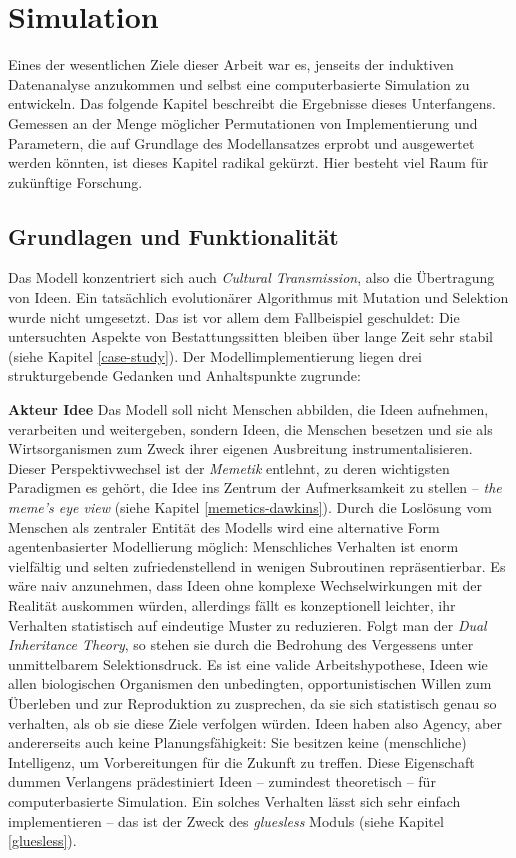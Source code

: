\documentclass[openany,twoside,twocolumn]{book}
\begin{document}
\hypertarget{simulation}{%
\section{Simulation}\label{simulation}}

Eines der wesentlichen Ziele dieser Arbeit war es, jenseits der
induktiven Datenanalyse anzukommen und selbst eine computerbasierte
Simulation zu entwickeln. Das folgende Kapitel beschreibt die Ergebnisse
dieses Unterfangens. Gemessen an der Menge möglicher Permutationen von
Implementierung und Parametern, die auf Grundlage des Modellansatzes
erprobt und ausgewertet werden könnten, ist dieses Kapitel radikal
gekürzt. Hier besteht viel Raum für zukünftige Forschung.

\hypertarget{simulation-theorie}{%
\subsection{Grundlagen und Funktionalität}\label{simulation-theorie}}

Das Modell konzentriert sich auch \emph{Cultural Transmission}, also die
Übertragung von Ideen. Ein tatsächlich evolutionärer Algorithmus mit
Mutation und Selektion wurde nicht umgesetzt. Das ist vor allem dem
Fallbeispiel geschuldet: Die untersuchten Aspekte von Bestattungssitten
bleiben über lange Zeit sehr stabil (siehe Kapitel \ref{case-study}).
Der Modellimplementierung liegen drei strukturgebende Gedanken und
Anhaltspunkte zugrunde:

\textbf{Akteur Idee} \newline  Das Modell soll nicht Menschen abbilden,
die Ideen aufnehmen, verarbeiten und weitergeben, sondern Ideen, die
Menschen besetzen und sie als Wirtsorganismen zum Zweck ihrer eigenen
Ausbreitung instrumentalisieren. Dieser Perspektivwechsel ist der
\emph{Memetik} entlehnt, zu deren wichtigsten Paradigmen es gehört, die
Idee ins Zentrum der Aufmerksamkeit zu stellen -- \emph{the meme's eye
view} (siehe Kapitel \ref{memetics-dawkins}). Durch die Loslösung vom
Menschen als zentraler Entität des Modells wird eine alternative Form
agentenbasierter Modellierung möglich: Menschliches Verhalten ist enorm
vielfältig und selten zufriedenstellend in wenigen Subroutinen
repräsentierbar. Es wäre naiv anzunehmen, dass Ideen ohne komplexe
Wechselwirkungen mit der Realität auskommen würden, allerdings fällt es
konzeptionell leichter, ihr Verhalten statistisch auf eindeutige Muster
zu reduzieren. Folgt man der \emph{Dual Inheritance Theory}, so stehen
sie durch die Bedrohung des Vergessens unter unmittelbarem
Selektionsdruck. Es ist eine valide Arbeitshypothese, Ideen wie allen
biologischen Organismen den unbedingten, opportunistischen Willen zum
Überleben und zur Reproduktion zu zusprechen, da sie sich statistisch
genau so verhalten, als ob sie diese Ziele verfolgen würden. Ideen haben
also Agency, aber andererseits auch keine Planungsfähigkeit: Sie
besitzen keine (menschliche) Intelligenz, um Vorbereitungen für die
Zukunft zu treffen. Diese Eigenschaft dummen Verlangens prädestiniert
Ideen -- zumindest theoretisch -- für computerbasierte Simulation. Ein
solches Verhalten lässt sich sehr einfach implementieren -- das ist der
Zweck des \emph{gluesless} Moduls (siehe Kapitel \ref{gluesless}).
\end{document}

